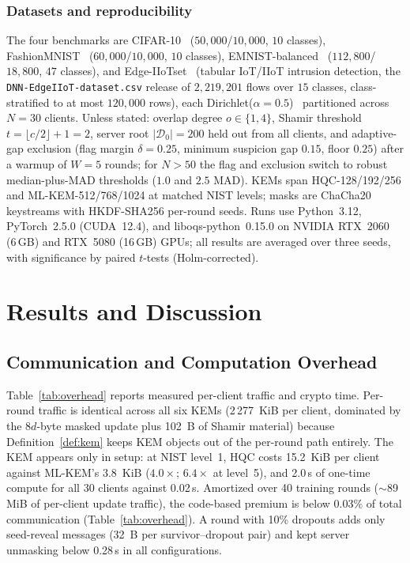 \documentclass[lettersize,journal]{IEEEtran}
\begin{document}
\subsubsection{Datasets and reproducibility} The four benchmarks are CIFAR-10~\cite{krizhevsky2009} ($50{,}000$/$10{,}000$, $10$ classes), FashionMNIST~\cite{fashionmnist} ($60{,}000$/$10{,}000$, $10$ classes), EMNIST-balanced~\cite{emnist} ($112{,}800$/$18{,}800$, $47$ classes), and Edge-IIoTset~\cite{edgeiiot} (tabular IoT/IIoT intrusion detection, the \texttt{DNN-EdgeIIoT-dataset.csv} release of $2{,}219{,}201$ flows over $15$ classes, class-stratified to at most $120{,}000$ rows), each Dirichlet($\alpha{=}0.5$)~\cite{hsu2019} partitioned across $N{=}30$ clients. Unless stated: overlap degree $o\in\{1,4\}$, Shamir threshold $t{=}\lfloor c/2\rfloor{+}1{=}2$, server root $|\mathcal{D}_0|{=}200$ held out from all clients, and adaptive-gap exclusion (flag margin $\delta{=}0.25$, minimum suspicion gap $0.15$, floor $0.25$) after a warmup of $W{=}5$ rounds; for $N{>}50$ the flag and exclusion switch to robust median-plus-MAD thresholds ($1.0$ and $2.5$ MAD). KEMs span HQC-128/192/256 and ML-KEM-512/768/1024 at matched NIST levels; masks are ChaCha20 keystreams with HKDF-SHA256 per-round seeds. Runs use Python~3.12, PyTorch~2.5.0 (CUDA~12.4), and liboqs-python~0.15.0 on NVIDIA RTX~2060 (6\,GB) and RTX~5080 (16\,GB) GPUs; all results are averaged over three seeds, with significance by paired $t$-tests (Holm-corrected).

\section{Results and Discussion}
\subsection{Communication and Computation Overhead}
Table~\ref{tab:overhead} reports measured per-client traffic and crypto time.
Per-round traffic is identical across all six KEMs (2\,277~KiB per client,
dominated by the $8d$-byte masked update plus 102~B of Shamir material) because
Definition~\ref{def:kem} keeps KEM objects out of the per-round path entirely. The
KEM appears only in setup: at NIST level~1, HQC costs 15.2~KiB per client against
ML-KEM's 3.8~KiB ($4.0\times$; $6.4\times$ at level~5), and 2.0\,s of one-time
compute for all 30 clients against 0.02\,s. Amortized over 40 training rounds
($\sim$89\,MiB of per-client update traffic), the code-based premium is below
$0.03\%$ of total communication (Table~\ref{tab:overhead}). A round with 10\% dropouts
adds only seed-reveal messages (32~B per survivor--dropout pair) and kept server
unmasking below 0.28\,s in all configurations.
\end{document}
